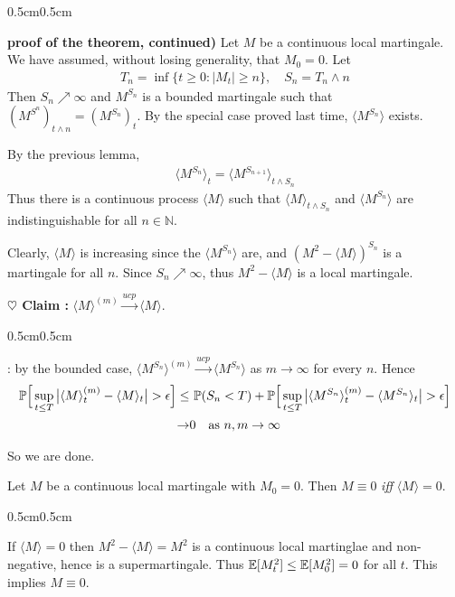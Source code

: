 \documentclass[12pt,a4paper]{article}
\newenvironment{proof}
{\begin{changemargin}{0.5cm}{0.5cm} 
	}%
	{\end{changemargin}
}
\newenvironment{subproof}
{\begin{changemargin}{0.5cm}{0.5cm} 
	}%
	{\end{changemargin}
}
\newenvironment{p}
{\begin{proof} 
	}%
	{\end{proof}
}
\begin{document}
\begin{p}
\textbf{proof of the theorem, continued)} Let $M$ be a continuous local martingale. We have assumed, without losing generality, that $M_0 =0$. Let
\begin{align*}
T_n = \inf \{t\geq 0 : |M_t|\geq n\}, \quad S_n = T_n \wedge n
\end{align*}
Then $S_n \nearrow \infty$ and $M^{S_n}$ is a bounded martingale such that $(M^{S^n})_{t\wedge n} = (M^{S_n})_t$. By the special case proved last time, $\langle M^{S_n} \rangle$ exists.

\quad By the previous lemma, 
\begin{align*}
\langle M^{S_n}\rangle_t = \langle M^{S_{n+1}} \rangle_{t\wedge S_n}
\end{align*}
Thus there is a continuous process $\langle M \rangle$ such that $\langle M\rangle_{t\wedge S_n}$ and $\langle M^{S_n} \rangle$ are indistinguishable for all $n\in \mathbb{N}$.

\quad Clearly, $\langle M \rangle$ is increasing since the $\langle M^{S_n} \rangle$ are, and $(M^2 - \langle M \rangle)^{S_n}$ is a martingale for all $n$. Since $S_n \nearrow \infty$, thus $M^2- \langle M \rangle$ is a local martingale.
\s

\textbf{$\heartsuit$ Claim :} $\langle M \rangle^{(m)} \xrightarrow{ucp} \langle M \rangle$.
\begin{subproof}
: by the bounded case, $\langle M^{S_n} \rangle^{(m)} \xrightarrow{ucp} \langle M^{S_n} \rangle$ as $m\rightarrow \infty$ for every $n$. Hence
\begin{align*}
\mathbb{P} \Big[ \sup_{t\leq T}  \big| \langle M \rangle_t^{(m)} -\langle M \rangle_t \big| > \epsilon \Big] \leq & \,\, \mathbb{P} (S_n < T) + \mathbb{P} \Big[ \sup_{t\leq T} \big| \langle M^{S_n} \rangle_t^{(m)} -\langle M^{S_n} \rangle_t \big| > \epsilon \Big] \\
\rightarrow & 0 \quad \text{as } n, m\rightarrow \infty
\end{align*}
\end{subproof}
So we are done.

\eop
\end{p}
\s

\fact Let $M$ be a continuous local martingale with $M_0 =0$. Then $M\equiv 0$ \emph{iff} $\langle M \rangle =0$.
\begin{p}
\pf If $\langle M \rangle =0$ then $M^2 - \langle M \rangle = M^2$ is a continuous local martinglae and non-negative, hence is a supermartingale. Thus $\mathbb{E} [M_t^2] \leq \mathbb{E} [M_0^2] =0$ for all $t$. This implies $M\equiv 0$.

\eop
\end{p}
\s
\end{document}
